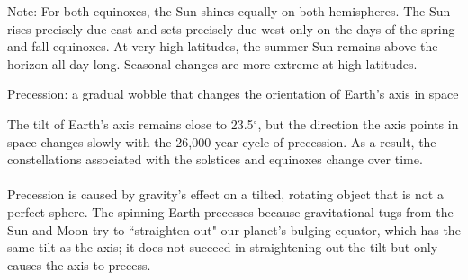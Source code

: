 \documentclass[12pt]{article}
\begin{document}
Note: For both equinoxes, the Sun shines equally on both hemispheres. The Sun rises precisely due east and sets precisely due west only on the days of the spring and fall equinoxes. \newline
At very high latitudes, the summer Sun remains above the horizon all day long. Seasonal changes are more extreme at high latitudes. 
\begin{definition} Precession: a gradual wobble that changes the orientation of Earth's axis in space \end{definition} 
The tilt of Earth's axis remains close to 23.5$^\circ$, but the direction the axis points in space changes slowly with the 26,000 year cycle of precession. As a result, the constellations associated with the solstices and equinoxes change over time. \\~\\ 
Precession is caused by gravity's effect on a tilted, rotating object that is not a perfect sphere. The spinning Earth precesses because gravitational tugs from the Sun and Moon try to ``straighten out" our planet's bulging equator, which has the same tilt as the axis; it does not succeed in straightening out the tilt but only causes the axis to precess. 
\end{document}
